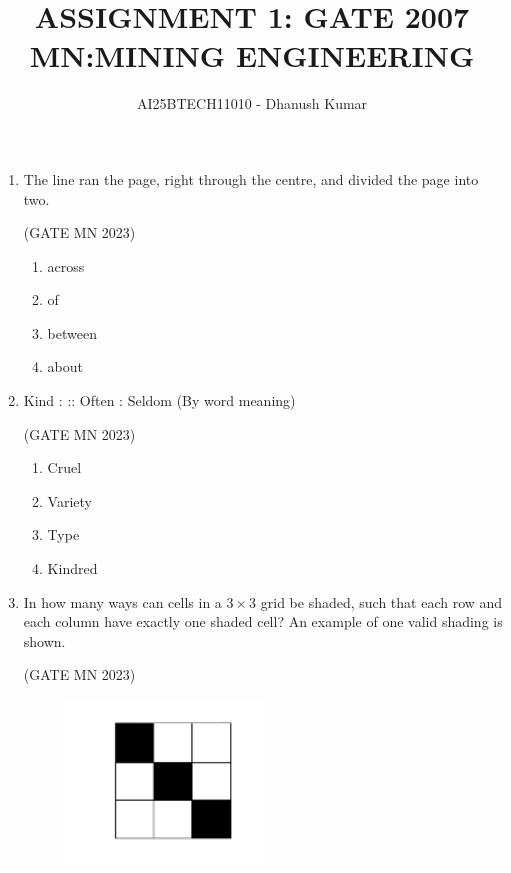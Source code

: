 \documentclass[journal]{IEEEtran}
\begin{document}
\title{
ASSIGNMENT 1: GATE 2007 \\
MN:MINING ENGINEERING}
\author{AI25BTECH11010 - Dhanush Kumar}
\maketitle
\renewcommand{\thefigure}{\theenumi}
\renewcommand{\thetable}{\theenumi}

\begin{enumerate}
    \item The line ran \underline{\hspace{2cm}} the page, right through the centre, and divided the page into 
two.

		\hfill(GATE MN 2023)
\begin{multicols}{2}
\begin{enumerate}
\item across 
\item of
\item between
\item about  
\end{enumerate}
\end{multicols}


\item Kind : \underline{\hspace{2cm}} :: Often : Seldom (By word meaning)


	\hfill(GATE MN 2023)
\begin{multicols}{2}
\begin{enumerate}
    \item Cruel
    \item Variety
    \item Type
    \item Kindred
\end{enumerate}
\end{multicols}

\item In how many ways can cells in a $3 \times 3$ grid be shaded, such that each row and each column have exactly one shaded cell? An example of one valid shading is shown.


	\hfill(GATE MN 2023)
\begin{figure}[H]                                
\centering
\includegraphics[width=0.5\textwidth]{Screenshot_2025_0821_162234.png}
\caption{}                                     
\label{fig:Q3}                             
\end{figure}


\end{enumerate}
\end{document}
